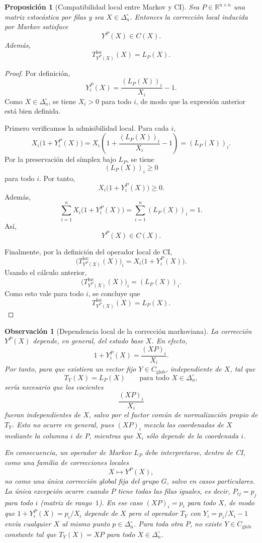 \documentclass[12pt]{article}
\newtheorem{proposicion}{Proposición}[section]
\newtheorem{observacion}{Observación}[section]
\begin{document}
\begin{proposicion}[Compatibilidad local entre Markov y CI]
Sea \(P\in\mathbb{R}^{n\times n}\) una matriz estocástica por filas y sea
\(X\in\Delta_n^\circ\). Entonces la corrección local inducida por Markov satisface
\[
Y^P(X)\in C(X).
\]
Además,
\[
T^{\mathrm{loc}}_{Y^P(X)}(X)=L_P(X).
\]
\end{proposicion}

\begin{proof}
Por definición,
\[
Y_i^P(X)
=
\frac{(L_P(X))_i}{X_i}-1.
\]
Como \(X\in\Delta_n^\circ\), se tiene \(X_i>0\) para todo \(i\), de modo que la expresión
anterior está bien definida.

Primero verificamos la admisibilidad local. Para cada \(i\),
\[
X_i\bigl(1+Y_i^P(X)\bigr)
=
X_i\left(1+\frac{(L_P(X))_i}{X_i}-1\right)
=
(L_P(X))_i.
\]
Por la preservación del símplex bajo \(L_P\), se tiene
\[
(L_P(X))_i\geq 0
\]
para todo \(i\). Por tanto,
\[
X_i\bigl(1+Y_i^P(X)\bigr)\geq 0.
\]
Además,
\[
\sum_{i=1}^{n}X_i\bigl(1+Y_i^P(X)\bigr)
=
\sum_{i=1}^{n}(L_P(X))_i
=
1.
\]
Así,
\[
Y^P(X)\in C(X).
\]

Finalmente, por la definición del operador local de CI,
\[
\bigl(T^{\mathrm{loc}}_{Y^P(X)}(X)\bigr)_i
=
X_i\bigl(1+Y_i^P(X)\bigr).
\]
Usando el cálculo anterior,
\[
\bigl(T^{\mathrm{loc}}_{Y^P(X)}(X)\bigr)_i
=
(L_P(X))_i.
\]
Como esto vale para todo \(i\), se concluye que
\[
T^{\mathrm{loc}}_{Y^P(X)}(X)=L_P(X).
\]
\end{proof}
\begin{observacion}[Dependencia local de la corrección markoviana]
La corrección \(Y^P(X)\) depende, en general, del estado base \(X\). En efecto,
\[
1+Y_i^P(X)
=
\frac{(XP)_i}{X_i}.
\]
Por tanto, para que existiera un vector fijo \(Y\in C_{\mathrm{glob}}\), independiente de
\(X\), tal que
\[
T_Y(X)=L_P(X)
\qquad
\text{para todo } X\in\Delta_n^\circ,
\]
sería necesario que los cocientes
\[
\frac{(XP)_i}{X_i}
\]
fueran independientes de \(X\), salvo por el factor común de normalización propio de
\(T_Y\). Esto no ocurre en general, pues \((XP)_i\) mezcla las coordenadas de \(X\) mediante
la columna \(i\) de \(P\), mientras que \(X_i\) sólo depende de la coordenada \(i\).

En consecuencia, un operador de Markov \(L_P\) debe interpretarse, dentro de CI, como una
familia de correcciones locales
\[
X\longmapsto Y^P(X),
\]
no como una única corrección global fija del grupo \(G\), salvo en casos particulares.
La única excepción ocurre cuando $P$ tiene todas las filas iguales, es decir,
$P_{ij}=p_j$ para todo $i$ (matriz de rango~$1$). En ese caso
$(XP)_i = p_i$ para todo $X$, de modo que $1+Y_i^P(X)=p_i/X_i$ depende
de $X$ pero el operador $T_Y$ con $Y_i=p_i/X_i-1$ envía cualquier $X$
al mismo punto $p\in\Delta_n^\circ$. Para toda otra $P$, no existe
$Y\in C_{\mathrm{glob}}$ constante tal que $T_Y(X)=XP$ para todo
$X\in\Delta_n^\circ$.

\end{observacion}
\end{document}
